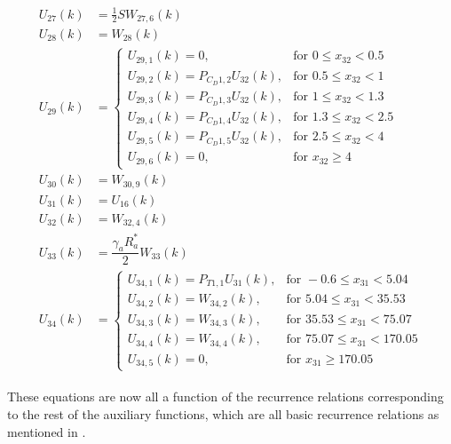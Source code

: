 \begin{align} \label{eq:allRecRel3}
\begin{split}
U_{27} \left(k\right)&= \frac{1}{2}SW_{27,6}\left(k\right) \\
U_{28} \left(k\right)&= W_{28}\left(k\right) \\
U_{29} \left(k\right)&=\begin{cases}
U_{29,1}\left(k\right)=0, & \text{for } 0\leq x_{32} < 0.5\\
U_{29,2}\left(k\right)=P_{C_{D} 1,2}U_{32}\left(k\right), &  \text{for } 0.5\leq x_{32} < 1 \\
U_{29,3}\left(k\right)=P_{C_{D} 1,3}U_{32}\left(k\right), &  \text{for } 1\leq x_{32} < 1.3 \\
U_{29,4}\left(k\right)=P_{C_{D} 1,4}U_{32}\left(k\right), &  \text{for } 1.3\leq x_{32} < 2.5 \\
U_{29,5}\left(k\right)=P_{C_{D} 1,5}U_{32}\left(k\right), &  \text{for } 2.5\leq x_{32} < 4 \\
U_{29,6}\left(k\right)=0, &  \text{for } x_{32} \geq 4 
\end{cases}\\
U_{30} \left(k\right)&=W_{30,9}\left(k\right) \\
U_{31} \left(k\right)&= U_{16}\left(k\right)\\
U_{32} \left(k\right)&= W_{32,4}\left(k\right)\\
U_{33} \left(k\right)&= \dfrac{\gamma_{a}R_{a}^{*}}{2}W_{33}\left(k\right) \\
U_{34}\left(k\right)&=\begin{cases}
U_{34,1}\left(k\right)=P_{T 1,1}U_{31}\left(k\right), & \text{for } -0.6 \leq x_{31} < 5.04  \\
U_{34,2}\left(k\right)=W_{34,2}\left(k\right), &  \text{for } 5.04\leq x_{31} < 35.53   \\
U_{34,3}\left(k\right)=W_{34,3}\left(k\right), &  \text{for } 35.53\leq x_{31} < 75.07   \\
U_{34,4}\left(k\right)=W_{34,4}\left(k\right), &  \text{for } 75.07\leq x_{31} < 170.05   \\
U_{34,5}\left(k\right)=0, &  \text{for }  x_{31} \geq 170.05   
\end{cases}
\end{split}
\end{align}



These equations are now all a function of the recurrence relations corresponding to the rest of the auxiliary functions, which are all basic recurrence relations as mentioned in . \\

